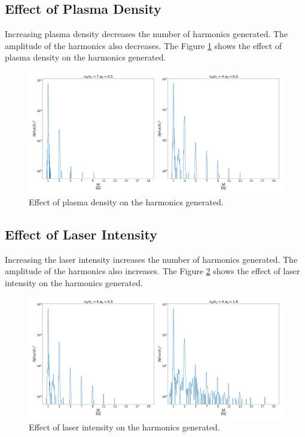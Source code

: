 \documentclass[12pt]{article}
\newenvironment{changemargin}[2]{%
\begin{list}{}{%
\setlength{\topsep}{0pt}%
\setlength{\leftmargin}{#1}%
\setlength{\rightmargin}{#2}%
\setlength{\listparindent}{\parindent}%
\setlength{\itemindent}{\parindent}%
\setlength{\parsep}{\parskip}%
}%
\item[]}{\end{list}}
\begin{document}
\begin{changemargin}{-2cm}{-2cm}
    \subsection{Effect of Plasma Density}
    Increasing plasma density decreases the number of harmonics generated. The amplitude of the harmonics also decreases. The Figure \ref{fig:density} shows the effect of plasma density on the harmonics generated.
    \begin{figure}[h]
        \centering
        \includegraphics[width=1.0\textwidth]{images/density.jpg}
        \caption{Effect of plasma density on the harmonics generated.}
        \label{fig:density}
    \end{figure}
    \subsection{Effect of Laser Intensity}
    Increasing the laser intensity increases the number of harmonics generated. The amplitude of the harmonics also increases. The Figure \ref{fig:intensity} shows the effect of laser intensity on the harmonics generated.

    \begin{figure}[h]
        \centering
        \includegraphics[width=1.0\textwidth, height=0.4\textwidth]{images/intensity.jpg}
        \caption{Effect of laser intensity on the harmonics generated.}
        \label{fig:intensity}
    \end{figure}

\end{changemargin}
\end{document}
